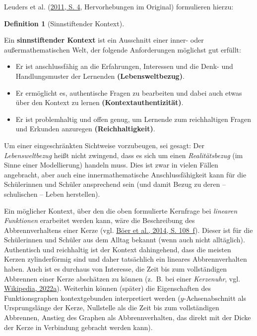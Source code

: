 \documentclass[
]{scrbook}
\providecommand{\tightlist}{%
  \setlength{\itemsep}{0pt}\setlength{\parskip}{0pt}}
\theoremstyle{definition}
\newtheorem{definition}{Definition}[chapter]
\theoremstyle{definition}
\theoremstyle{definition}
\theoremstyle{definition}
\theoremstyle{remark}
\begin{document}
Leuders et al. (\protect\hyperlink{ref-Leuders2011}{2011, S. 4}, Hervorhebungen im Original) formulieren hierzu:

\begin{definition}[Sinnstiftender Kontext]
\protect\hypertarget{def:Kontext}{}\label{def:Kontext}

Ein \textbf{sinnstiftender Kontext} ist ein Ausschnitt einer inner- oder außermathematischen Welt, der folgende Anforderungen möglichst gut erfüllt:

\begin{itemize}
\tightlist
\item
  Er ist anschlussfähig an die Erfahrungen, Interessen und die Denk- und Handlungsmuster der Lernenden \textbf{(Lebensweltbezug)}.
\item
  Er ermöglicht es, authentische Fragen zu bearbeiten und dabei auch etwas über den Kontext zu lernen \textbf{(Kontextauthentizität)}.
\item
  Er ist problemhaltig und offen genug, um Lernende zum reichhaltigen Fragen und Erkunden anzuregen \textbf{(Reichhaltigkeit)}.
\end{itemize}

\end{definition}

Um einer eingeschränkten Sichtweise vorzubeugen, sei gesagt: Der \emph{Lebensweltbezug} heißt nicht zwingend, dass es sich um einen \emph{Realitätsbezug} (im Sinne einer Modellierung) handeln muss. Dies ist zwar in vielen Fällen angebracht, aber auch eine innermathematische Anschlussfähigkeit kann für die Schülerinnen und Schüler ansprechend sein (und damit Bezug zu deren -- schulischen -- Leben herstellen).

Ein möglicher Kontext, über den die oben formulierte Kernfrage bei \emph{linearen Funktionen} erarbeitet werden kann, wäre die Beschreibung des Abbrennverhaltens einer Kerze (vgl. \protect\hyperlink{ref-Boeer2014}{Böer et al., 2014, S. 108~f}). Dieser ist für die Schülerinnen und Schüler aus dem Alltag bekannt (wenn auch nicht alltäglich). Authentisch und reichhaltig ist der Kontext dahingehend, dass die meisten Kerzen zylinderförmig sind und daher tatsächlich ein lineares Abbrennverhalten haben. Auch ist es durchaus von Interesse, die Zeit bis zum vollständigen Abbrennen einer Kerze abschätzen zu können (z.~B. bei einer \emph{Kerzenuhr}, vgl. \protect\hyperlink{ref-WikiKerze}{Wikipedia, 2022a}). Weiterhin können (später) die Eigenschaften des Funktionsgraphen kontextgebunden interpretiert werden (\(y\)-Achsenabschnitt als Ursprungslänge der Kerze, Nullstelle als die Zeit bis zum vollständigen Abbrennen, Anstieg des Graphen als Abbrennverhalten, das direkt mit der Dicke der Kerze in Verbindung gebracht werden kann).
\end{document}
